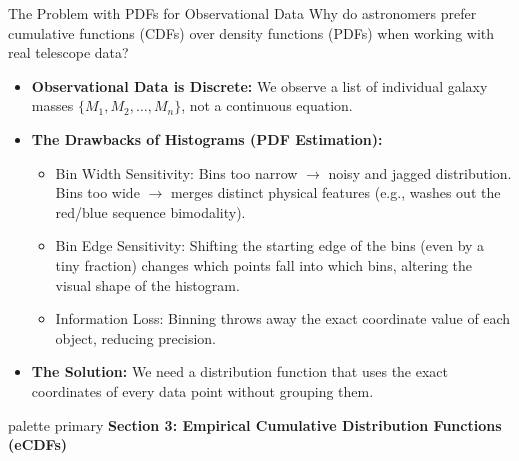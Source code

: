 \documentclass[9pt]{beamer}
\begin{document}
\begin{frame}{The Problem with PDFs for Observational Data}
  Why do astronomers prefer cumulative functions (CDFs) over density functions (PDFs) when working with real telescope data?
  \begin{itemize}
    \item \textbf{Observational Data is Discrete:} We observe a list of individual galaxy masses $\{M_1, M_2, \dots, M_n\}$, not a continuous equation.
    \item \textbf{The Drawbacks of Histograms (PDF Estimation):}
      \begin{itemize}
        \item \alert{Bin Width Sensitivity:} Bins too narrow $\rightarrow$ noisy and jagged distribution. Bins too wide $\rightarrow$ merges distinct physical features (e.g., washes out the red/blue sequence bimodality).
        \item \alert{Bin Edge Sensitivity:} Shifting the starting edge of the bins (even by a tiny fraction) changes which points fall into which bins, altering the visual shape of the histogram.
        \item \alert{Information Loss:} Binning throws away the exact coordinate value of each object, reducing precision.
      \end{itemize}
    \item \textbf{The Solution:} We need a distribution function that uses the exact coordinates of every data point without grouping them.
  \end{itemize}
\end{frame}

\begin{frame}[plain]
  \vfill
  \centering
  \begin{beamercolorbox}[sep=8pt,center,shadow=true,rounded=true]{palette primary}
    \textbf{Section 3: Empirical Cumulative Distribution Functions (eCDFs)}
  \end{beamercolorbox}
  \vfill
\end{frame}
\end{document}
